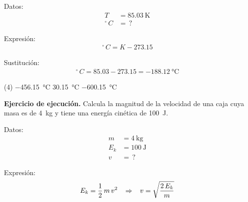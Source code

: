 \documentclass[12pt, letter]{exam}
\begin{document}
\begin{questions}
    \begin{minipage}[t]{0.35\linewidth}
        Datos: 
        \begin{align*}
        T &= \SI{85.03}{\kelvin} \\
        {}^{\circ} \, C &= \, ?
        \end{align*}
        \end{minipage}
        \hspace{1cm}
        \begin{minipage}[t]{0.4\linewidth}
        Expresión:
        \begin{align*}
        {}^{\circ} \, C = K - 273.15
        \end{align*}
        \end{minipage}

        \vspace*{0.5cm}
        Sustitución:
        \begin{align*}
        {}^{\circ} \, C = 85.03 - 273.15 = \SI{-188.12}{\degreeCelsius}
        \end{align*}

    \begin{tasks}(4)
        \task {}
        \task \SI{-456.15}{\degreeCelsius}
        \task \SI{30.15}{\degreeCelsius}
        \task \SI{-600.15}{\degreeCelsius}
    \end{tasks}
    
    \setcounter{question}{34} \question \label{Ejercicio_12} \textbf{Ejercicio de ejecución. } Calcula la magnitud de la velocidad de una caja cuya masa es de \SI{4}{\kilo\gram} y tiene una energía cinética de \SI{100}{\joule}.

    \begin{minipage}[t]{0.35\linewidth}
    Datos: 
    \begin{align*}
    m &= \SI{4}{\kilo\gram} \\
    E_{k} &= \SI{100}{\joule} \\
    v &= \, ?
    \end{align*}
    \end{minipage}
    \hspace{1cm}
    \begin{minipage}[t]{0.4\linewidth}
    Expresión:
    \begin{align*}
    E_{k} = \dfrac{1}{2} \, m \, v^{2} \hspace{0.3cm} \Rightarrow \hspace{0.3cm} v = \sqrt{\dfrac{2 \, E_{k}}{m}}
    \end{align*}
    \end{minipage}


\end{questions}
\end{document}
